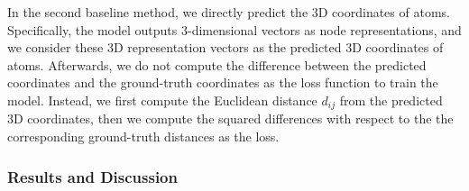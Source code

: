\documentclass{article}
\begin{document}
In the second baseline method, we  directly predict the 3D coordinates of atoms. Specifically, the model outputs 3-dimensional vectors as node representations, and we consider these 3D representation vectors as the predicted 3D coordinates of atoms. Afterwards, we do not compute the difference between the predicted coordinates and the ground-truth coordinates as the loss function to train the model. Instead, we first compute the Euclidean distance $d_{ij}$ from the predicted 3D coordinates, then we compute the squared differences with respect to the  the corresponding ground-truth distances as the loss.

\subsubsection{Results and Discussion}
\end{document}
